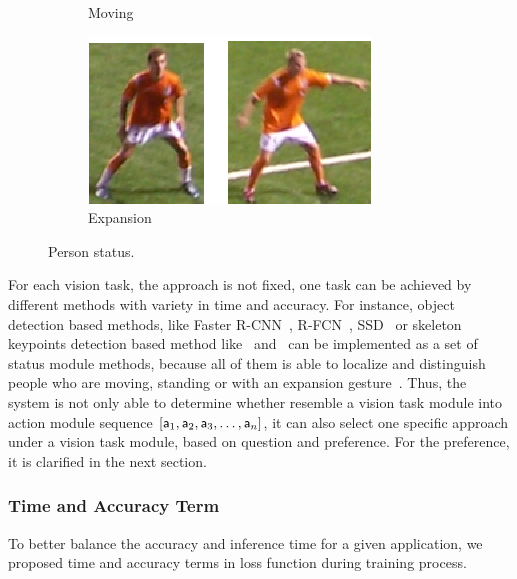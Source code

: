 {\begin{figure}[thb]
\begin{subfigure}[b]{0.127\textwidth}
                \caption{Moving}
                \label{fig:gull2}
        \end{subfigure}\quad
        \begin{subfigure}[b]{0.166\textwidth}
                \includegraphics[width=\linewidth]{figures/expand1.eps}
                \caption{Expansion}
                \label{fig:tiger}
        \end{subfigure}
        \caption{Person status.}\label{fig:Person Status}
\end{figure}
}



For each vision task, the approach is not fixed, one task can be achieved by different methods with variety in time and accuracy. For instance, object detection based methods, like Faster R-CNN~\cite{Ren:2015:FRT:2969239.2969250}, R-FCN~\cite{DBLP:conf/nips/DaiLHS16}, SSD~\cite{DBLP:conf/eccv/LiuAESRFB16} or skeleton keypoints detection based method like~\cite{cao2017realtime} and~\cite{wei2016cpm} can be implemented as a set of status module methods, because all of them is able to localize and distinguish people who are moving, standing or with an expansion gesture~\cite{peixi2019}. %
Thus, the system is not only able to determine whether resemble a vision task module into action module sequence $[{\mathsf{a}}_1,{\mathsf{a}}_2,{\mathsf{a}}_3,\dots,{\mathsf{a}}_n]$, it can also select one specific approach under a vision task module, based on question and preference. For the preference, it is clarified in the next section. 


\subsubsection{Time and Accuracy Term}
\label{sec-TimeAcc}
\hspace{\parindent} To better balance the accuracy and inference time for a given application, we proposed time and accuracy terms in loss function during training process.

